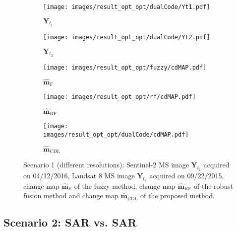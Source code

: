 \documentclass[review]{elsarticle}
\begin{document}
\begin{figure}[h!]
\centering
			\begin{subfigure}{\subfwidth}
					\centering	
					\texttt{[image: images/result\_opt\_opt/dualCode/Yt1.pdf]}
					\caption{$\mathbf{Y}_{t_1}$}
					\label{fig:s2s2Yt1_1}
			\end{subfigure}
			\begin{subfigure}{\subfwidth}
					\centering	
					\texttt{[image: images/result\_opt\_opt/dualCode/Yt2.pdf]}
					\caption{$\mathbf{Y}_{t_2}$}
					\label{fig:s2s2Yt2_1}
			\end{subfigure}
            \begin{subfigure}{\subfwidth}
					\centering
					\texttt{[image: images/result\_opt\_opt/fuzzy/cdMAP.pdf]}
					\caption{$\hat{\mathbf{m}}_{\mathrm{F}}$}
					\label{fig:s2s2FMAP_1}
			\end{subfigure}
            \begin{subfigure}{\subfwidth}
					\centering
					\texttt{[image: images/result\_opt\_opt/rf/cdMAP.pdf]}
					\caption{$\hat{\mathbf{m}}_{\mathrm{RF}}$}
					\label{fig:s2s2RFMAP_1}
			\end{subfigure}
			\begin{subfigure}{\subfwidth}
					\centering	
					\texttt{[image: images/result\_opt\_opt/dualCode/cdMAP.pdf]}
					\caption{$\hat{\mathbf{m}}_{\mathrm{CDL}}$}
					\label{fig:s2s2DCMAP_1}
			\end{subfigure}
\caption{Scenario 1 (different resolutions): \protect{}  Sentinel-2 MS image $\mathbf{Y}_{t_1}$ acquired on 04/12/2016, \protect{}  Landsat 8 MS image $\mathbf{Y}_{t_2}$ acquired on 09/22/2015, \protect{} change map $\hat{\mathbf{m}}_{\mathrm{F}}$ of the fuzzy method, \protect{} change map $\hat{\mathbf{m}}_{\mathrm{RF}}$ of the robust fusion method
	 and \protect{} change map $\hat{\mathbf{m}}_{\mathrm{CDL}}$ of the proposed method.}%
	\label{fig:realS2S2_1}%
\end{figure}


\subsection{Scenario 2: SAR vs. SAR}
\end{document}
